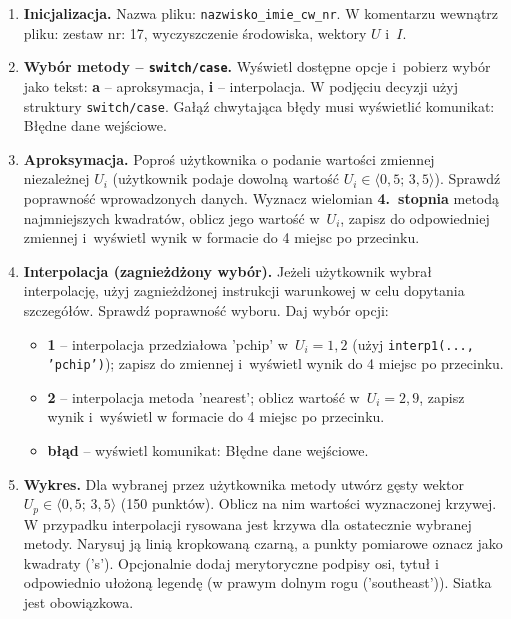 \documentclass[a4paper,11pt]{article}
\begin{document}
\begin{enumerate}[leftmargin=*, label=\textbf{\arabic*.}, itemsep=2pt]

  \item \textbf{Inicjalizacja.}
    Nazwa pliku: \texttt{nazwisko\_imie\_cw\_nr}. W komentarzu wewnątrz pliku: zestaw nr: 17, wyczyszczenie środowiska, wektory $U$ i~$I$.

  \item \textbf{Wybór metody -- \texttt{switch/case}.}
    Wyświetl dostępne opcje i~pobierz wybór jako tekst: \textbf{a} -- aproksymacja, \textbf{i} -- interpolacja. W podjęciu decyzji użyj struktury \texttt{switch/case}. Gałąź chwytająca błędy musi wyświetlić komunikat: Błędne dane wejściowe.

  \item \textbf{Aproksymacja.}
    Poproś użytkownika o podanie wartości zmiennej niezależnej $U_i$ (użytkownik podaje dowolną wartość $U_i \in \langle 0{,}5;\,3{,}5 \rangle$). Sprawdź poprawność wprowadzonych danych. Wyznacz wielomian \textbf{4.~stopnia} metodą najmniejszych kwadratów, oblicz jego wartość w~$U_i$, zapisz do odpowiedniej zmiennej i~wyświetl wynik w formacie do 4 miejsc po przecinku.

  \item \textbf{Interpolacja (zagnieżdżony wybór).}
    Jeżeli użytkownik wybrał interpolację, użyj zagnieżdżonej instrukcji warunkowej w celu dopytania szczegółów. Sprawdź poprawność wyboru. Daj wybór opcji:
    \begin{itemize}[itemsep=1pt]
      \item \textbf{1} -- interpolacja przedziałowa 'pchip' w~$U_i = 1{,}2$ (użyj \texttt{interp1(..., 'pchip')}); zapisz do zmiennej i~wyświetl wynik do 4 miejsc po przecinku.
      \item \textbf{2} -- interpolacja metoda 'nearest'; oblicz wartość w~$U_i = 2{,}9$, zapisz wynik i~wyświetl w formacie do 4 miejsc po przecinku.
      \item \textbf{błąd} -- wyświetl komunikat: Błędne dane wejściowe.
    \end{itemize}

  \item \textbf{Wykres.}
    Dla wybranej przez użytkownika metody utwórz gęsty wektor $U_p \in \langle 0{,}5;\,3{,}5 \rangle$ (150 punktów). Oblicz na nim wartości wyznaczonej krzywej. W przypadku interpolacji rysowana jest krzywa dla ostatecznie wybranej metody. Narysuj ją linią kropkowaną czarną, a punkty pomiarowe oznacz jako kwadraty ('s'). Opcjonalnie dodaj merytoryczne podpisy osi, tytuł i odpowiednio ułożoną legendę (w prawym dolnym rogu ('southeast')). Siatka jest obowiązkowa.

\end{enumerate}
\end{document}
